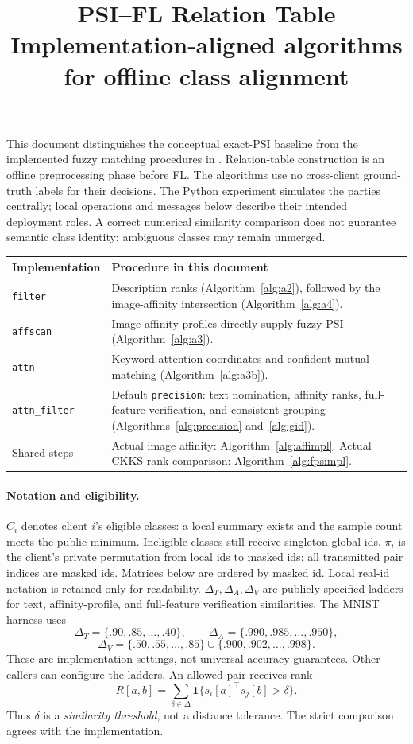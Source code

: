 \documentclass[11pt]{article}
\title{PSI--FL Relation Table\\\large Implementation-aligned algorithms for offline class alignment}
\author{}\date{}
\newcommand{\ind}{\mathbf{1}}
\begin{document}
\maketitle

\noindent This document distinguishes the conceptual exact-PSI baseline from the
implemented fuzzy matching procedures in .
Relation-table construction is an offline preprocessing phase before FL.
The algorithms use no cross-client ground-truth labels for their decisions.
The Python experiment simulates the parties centrally; local operations and
messages below describe their intended deployment roles.
A correct numerical similarity comparison does not guarantee semantic class
identity: ambiguous classes may remain unmerged.

\begin{center}\small
\begin{tabular}{@{}p{}p{}@{}}
\toprule
Implementation & Procedure in this document \\\midrule
\texttt{filter} & Description ranks (Algorithm~\ref{alg:a2}), followed by the image-affinity intersection (Algorithm~\ref{alg:a4}).\\
\texttt{affscan} & Image-affinity profiles directly supply fuzzy PSI (Algorithm~\ref{alg:a3}).\\
\texttt{attn} & Keyword attention coordinates and confident mutual matching (Algorithm~\ref{alg:a3b}).\\
\texttt{attn\_filter} & Default \texttt{precision}: text nomination, affinity ranks, full-feature verification, and consistent grouping (Algorithms~\ref{alg:precision} and~\ref{alg:gid}).\\
Shared steps & Actual image affinity: Algorithm~\ref{alg:affimpl}. Actual CKKS rank comparison: Algorithm~\ref{alg:fpsimpl}.\\
\bottomrule
\end{tabular}
\end{center}

\paragraph{Notation and eligibility.}
$C_i$ denotes client $i$'s eligible classes: a local summary exists and the
sample count meets the public minimum. Ineligible classes still receive
singleton global ids. $\pi_i$ is the client's private permutation from local
ids to masked ids; all transmitted pair indices are masked ids. Matrices below
are ordered by masked id. Local real-id notation is retained only for readability.
$\Delta_T,\Delta_A,\Delta_V$ are publicly specified ladders for text,
affinity-profile, and full-feature verification similarities.
The MNIST harness uses
\[
 \Delta_T=\{.90,.85,\ldots,.40\},\qquad
 \Delta_A=\{.990,.985,\ldots,.950\},
\]
\[
 \Delta_V=\{.50,.55,\ldots,.85\}\cup\{.900,.902,\ldots,.998\}.
\]
These are implementation settings, not universal accuracy guarantees. Other
callers can configure the ladders. An allowed pair receives rank
\[
 R[a,b]=\sum_{\delta\in\Delta}\ind\{s_i[a]^\top s_j[b]>\delta\}.
\]
Thus $\delta$ is a \emph{similarity threshold}, not a distance tolerance.
The strict comparison agrees with the implementation.
\end{document}
